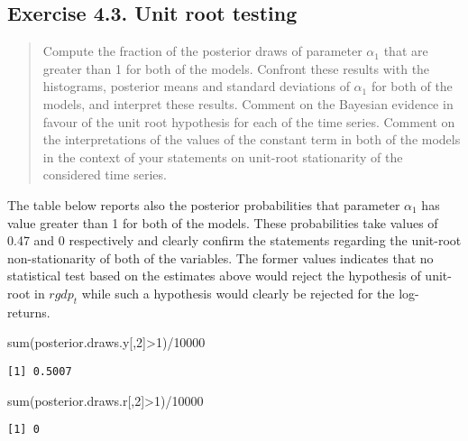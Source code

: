 \documentclass[
  letterpaper,
  DIV=11,
  numbers=noendperiod]{scrreprt}
\newenvironment{Shaded}{\begin{snugshade}}{\end{snugshade}}
\newcommand{\DecValTok}[1]{\textcolor[rgb]{0.68,0.00,0.00}{#1}}
\newcommand{\FunctionTok}[1]{\textcolor[rgb]{0.28,0.35,0.67}{#1}}
\newcommand{\NormalTok}[1]{\textcolor[rgb]{0.00,0.23,0.31}{#1}}
\newcommand{\SpecialCharTok}[1]{\textcolor[rgb]{0.37,0.37,0.37}{#1}}
\begin{document}
\hypertarget{exercise-4.3.-unit-root-testing}{%
\subsection*{Exercise 4.3. Unit root
testing}\label{exercise-4.3.-unit-root-testing}}

\begin{quote}
Compute the fraction of the posterior draws of parameter \(\alpha_1\)
that are greater than 1 for both of the models. Confront these results
with the histograms, posterior means and standard deviations of
\(\alpha_1\) for both of the models, and interpret these results.
Comment on the Bayesian evidence in favour of the unit root hypothesis
for each of the time series. Comment on the interpretations of the
values of the constant term in both of the models in the context of your
statements on unit-root stationarity of the considered time series.
\end{quote}

The table below reports also the posterior probabilities that parameter
\(\alpha_1\) has value greater than 1 for both of the models. These
probabilities take values of 0.47 and 0 respectively and clearly confirm
the statements regarding the unit-root non-stationarity of both of the
variables. The former values indicates that no statistical test based on
the estimates above would reject the hypothesis of unit-root in
\(rgdp_t\) while such a hypothesis would clearly be rejected for the
log-returns.

\begin{Shaded}
\begin{Highlighting}[]
\FunctionTok{sum}\NormalTok{(posterior.draws.y[,}\DecValTok{2}\NormalTok{]}\SpecialCharTok{\textgreater{}}\DecValTok{1}\NormalTok{)}\SpecialCharTok{/}\DecValTok{10000}
\end{Highlighting}
\end{Shaded}

\begin{verbatim}
[1] 0.5007
\end{verbatim}

\begin{Shaded}
\begin{Highlighting}[]
\FunctionTok{sum}\NormalTok{(posterior.draws.r[,}\DecValTok{2}\NormalTok{]}\SpecialCharTok{\textgreater{}}\DecValTok{1}\NormalTok{)}\SpecialCharTok{/}\DecValTok{10000}
\end{Highlighting}
\end{Shaded}

\begin{verbatim}
[1] 0
\end{verbatim}
\end{document}
